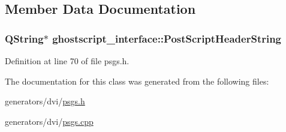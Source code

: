 \subsection{Member Data Documentation}
\hypertarget{classghostscript__interface_ae86990db25df0d7d5607fd58f573d8c1}{
\subsubsection[{Post\+Script\+Header\+String}]{\setlength{\rightskip}{0pt plus 5cm}Q\+String$\ast$ ghostscript\+\_\+interface\+::\+Post\+Script\+Header\+String}}\label{classghostscript__interface_ae86990db25df0d7d5607fd58f573d8c1}


Definition at line 70 of file psgs.\+h.



The documentation for this class was generated from the following files\+:\begin{DoxyCompactItemize}
\item 
generators/dvi/\hyperlink{psgs_8h}{psgs.\+h}\item 
generators/dvi/\hyperlink{psgs_8cpp}{psgs.\+cpp}\end{DoxyCompactItemize}

